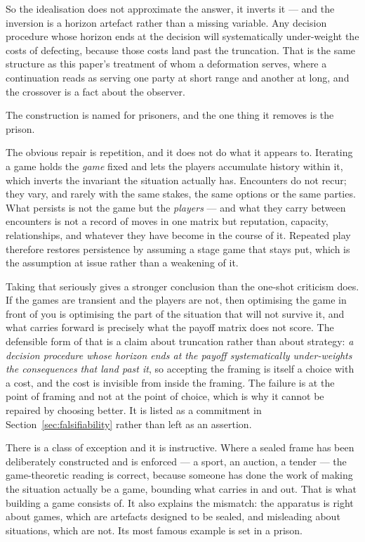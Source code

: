 \documentclass[11pt,a4paper]{article}
\theoremstyle{remark}
\begin{document}
So the idealisation does not approximate the answer, it inverts it --- and the inversion is a horizon
artefact rather than a missing variable. Any decision procedure whose horizon ends at the decision
will systematically under-weight the costs of defecting, because those costs land past the truncation.
That is the same structure as this paper's treatment of whom a deformation serves, where a
continuation reads as serving one party at short range and another at long, and the crossover is a
fact about the observer.

The construction is named for prisoners, and the
one thing it removes is the prison.

The obvious repair is repetition, and it does not do what it appears to. Iterating a game holds the
\emph{game} fixed and lets the players accumulate history within it, which inverts the invariant the
situation actually has. Encounters do not recur; they vary, and rarely with the same stakes, the same
options or the same parties. What persists is not the game but the \emph{players} --- and what they
carry between encounters is not a record of moves in one matrix but reputation, capacity,
relationships, and whatever they have become in the course of it. Repeated play therefore restores
persistence by assuming a stage game that stays put, which is the assumption at issue rather than a
weakening of it.

Taking that seriously gives a stronger conclusion than the one-shot criticism does. If the games are
transient and the players are not, then optimising the game in front of you is optimising the part of
the situation that will not survive it, and what carries forward is precisely what the payoff matrix
does not score. The defensible form of that is a claim about truncation rather than about strategy:
\emph{a decision procedure whose horizon ends at the payoff systematically under-weights the
consequences that land past it}, so accepting the framing is itself a choice with a cost, and the cost
is invisible from inside the framing. The failure is at the point of framing
and not at the point of choice, which is why it cannot be repaired by choosing better. It is listed as
a commitment in Section~\ref{sec:falsifiability} rather than left as an assertion.

There is a class of exception and it is instructive. Where a sealed frame has been deliberately
constructed and is enforced --- a sport, an auction, a tender --- the game-theoretic reading is
correct, because someone has done the work of making the situation actually be a game, bounding what
carries in and out. That is what building a game consists of. It also explains the mismatch: the
apparatus is right about games, which are artefacts designed to be sealed, and misleading about
situations, which are not. Its most famous example is set in a prison.
\end{document}
